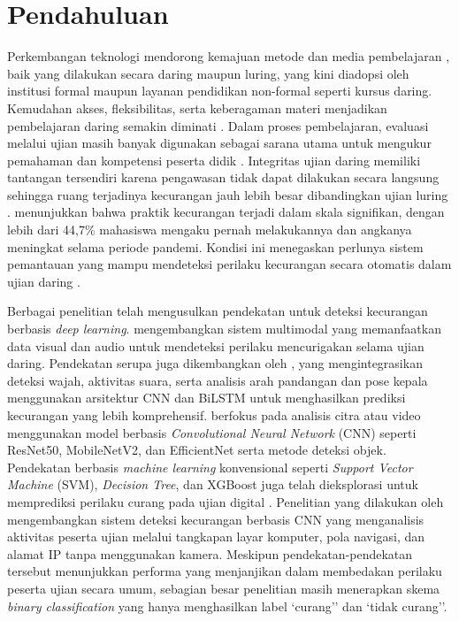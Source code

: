 \documentclass {rapidsart}
\theoremstyle{plain}
\theoremstyle{remark}
\theoremstyle{definition}
\begin{document}
\section{Pendahuluan}
\begin{sloppypar}

    Perkembangan teknologi mendorong kemajuan metode dan media pembelajaran \citep{Lindn2023}, baik yang dilakukan secara daring maupun luring, yang kini diadopsi oleh institusi formal maupun layanan pendidikan non-formal seperti kursus daring. Kemudahan akses, fleksibilitas, serta keberagaman materi menjadikan pembelajaran daring semakin diminati \citep{FelipeChild2023,Turan2022}. Dalam proses pembelajaran, evaluasi melalui ujian masih banyak digunakan sebagai sarana utama untuk mengukur pemahaman dan kompetensi peserta didik \citep{Ababneh2022}. Integritas ujian daring memiliki tantangan tersendiri karena pengawasan tidak dapat dilakukan secara langsung sehingga ruang terjadinya kecurangan jauh lebih besar dibandingkan ujian luring \citep{Fendler2024}. \citet{Newton2024} menunjukkan bahwa praktik kecurangan terjadi dalam skala signifikan, dengan lebih dari 44,7\% mahasiswa mengaku pernah melakukannya dan angkanya meningkat selama periode pandemi. Kondisi ini menegaskan perlunya sistem pemantauan yang mampu mendeteksi perilaku kecurangan secara otomatis dalam ujian daring \citep{Sakhipov2025}.
    
    Berbagai penelitian telah mengusulkan pendekatan untuk deteksi kecurangan berbasis \textit{deep learning}. \citet{Kaddoura2022} mengembangkan sistem multimodal yang memanfaatkan data visual dan audio untuk mendeteksi perilaku mencurigakan selama ujian daring. Pendekatan serupa juga dikembangkan oleh \citet{SangeetaLamba2024}, yang mengintegrasikan deteksi wajah, aktivitas suara, serta analisis arah pandangan dan pose kepala menggunakan arsitektur CNN dan BiLSTM untuk menghasilkan prediksi kecurangan yang lebih komprehensif. \citet{SihamEssahraui2025} berfokus pada analisis citra atau video menggunakan model berbasis \textit{Convolutional Neural Network} (CNN) seperti ResNet50, MobileNetV2, dan EfficientNet serta metode deteksi objek. Pendekatan berbasis \textit{machine learning} konvensional seperti \textit{Support Vector Machine} (SVM), \textit{Decision Tree}, dan XGBoost juga telah dieksplorasi untuk memprediksi perilaku curang pada ujian digital \citep{Erdem2025}. Penelitian yang dilakukan oleh \citet{Smirani2022} mengembangkan sistem deteksi kecurangan berbasis CNN yang menganalisis aktivitas peserta ujian melalui tangkapan layar komputer, pola navigasi, dan alamat IP tanpa menggunakan kamera. Meskipun pendekatan-pendekatan tersebut menunjukkan performa yang menjanjikan dalam membedakan perilaku peserta ujian secara umum, sebagian besar penelitian masih menerapkan skema \textit{binary classification} yang hanya menghasilkan label `curang'' dan `tidak curang''.
    

\end{sloppypar}
\end{document}
